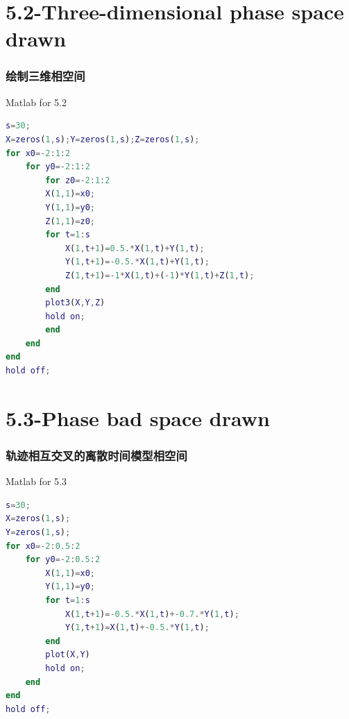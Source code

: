 \documentclass{beamer}
\begin{document}

\section{5.2-Three-dimensional phase space drawn}
     \begin{frame}[fragile]
      \frametitle{绘制三维相空间}
      Matlab for 5.2
\begin{lstlisting}[language=Matlab ,style=mystyle]
s=30;
X=zeros(1,s);Y=zeros(1,s);Z=zeros(1,s);
for x0=-2:1:2
    for y0=-2:1:2
        for z0=-2:1:2
        X(1,1)=x0;
        Y(1,1)=y0;
        Z(1,1)=z0;
        for t=1:s
            X(1,t+1)=0.5.*X(1,t)+Y(1,t);
            Y(1,t+1)=-0.5.*X(1,t)+Y(1,t);
            Z(1,t+1)=-1*X(1,t)+(-1)*Y(1,t)+Z(1,t);
        end
        plot3(X,Y,Z)
        hold on;
        end
    end
end
hold off;
\end{lstlisting} 
\end{frame}



\section{5.3-Phase bad space drawn}
     \begin{frame}[fragile]
      \frametitle{轨迹相互交叉的离散时间模型相空间}
       \begin{alertblock}{Matlab for 5.3}
\begin{lstlisting}[language=Matlab ,style=mystyle]
s=30;
X=zeros(1,s);
Y=zeros(1,s);
for x0=-2:0.5:2
    for y0=-2:0.5:2
        X(1,1)=x0;
        Y(1,1)=y0;
        for t=1:s
            X(1,t+1)=-0.5.*X(1,t)+-0.7.*Y(1,t);
            Y(1,t+1)=X(1,t)+-0.5.*Y(1,t);
        end
        plot(X,Y)
        hold on;
    end
end
hold off;
\end{lstlisting}
\end{alertblock}
     \end{frame}

\begin{frame}{}
\begin{block}{}
\centerline{\huge{\itshape{}}}
\end{block}
\end{frame}


\end{document}
